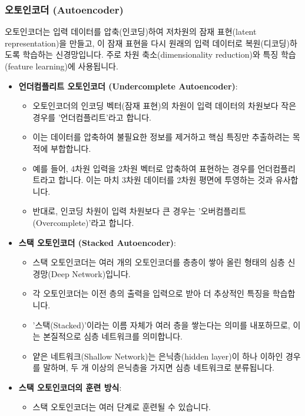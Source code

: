 \documentclass[11pt,a4paper]{article}
\begin{document}
\subsubsection*{오토인코더 (Autoencoder)}
\begin{conceptbox}
오토인코더는 입력 데이터를 압축(인코딩)하여 저차원의 잠재 표현(latent representation)을 만들고, 이 잠재 표현을 다시 원래의 입력 데이터로 복원(디코딩)하도록 학습하는 신경망입니다.
주로 차원 축소(dimensionality reduction)와 특징 학습(feature learning)에 사용됩니다.
\end{conceptbox}

\begin{itemize}
    \item \textbf{언더컴플리트 오토인코더 (Undercomplete Autoencoder)}:
    \begin{itemize}
        \item 오토인코더의 인코딩 벡터(잠재 표현)의 차원이 입력 데이터의 차원보다 작은 경우를 '언더컴플리트'라고 합니다.
        \item 이는 데이터를 압축하여 불필요한 정보를 제거하고 핵심 특징만 추출하려는 목적에 부합합니다.
        \item 예를 들어, 4차원 입력을 2차원 벡터로 압축하여 표현하는 경우를 언더컴플리트라고 합니다. 이는 마치 3차원 데이터를 2차원 평면에 투영하는 것과 유사합니다.
        \item 반대로, 인코딩 차원이 입력 차원보다 큰 경우는 '오버컴플리트(Overcomplete)'라고 합니다.
    \end{itemize}
    \item \textbf{스택 오토인코더 (Stacked Autoencoder)}:
    \begin{itemize}
        \item 스택 오토인코더는 여러 개의 오토인코더를 층층이 쌓아 올린 형태의 심층 신경망(Deep Network)입니다.
        \item 각 오토인코더는 이전 층의 출력을 입력으로 받아 더 추상적인 특징을 학습합니다.
        \item '스택(Stacked)'이라는 이름 자체가 여러 층을 쌓는다는 의미를 내포하므로, 이는 본질적으로 심층 네트워크를 의미합니다.
        \item 얕은 네트워크(Shallow Network)는 은닉층(hidden layer)이 하나 이하인 경우를 말하며, 두 개 이상의 은닉층을 가지면 심층 네트워크로 분류됩니다.
    \end{itemize}
    \item \textbf{스택 오토인코더의 훈련 방식}:
    \begin{itemize}
        \item 스택 오토인코더는 여러 단계로 훈련될 수 있습니다.

\end{itemize}
\end{itemize}
\end{document}
